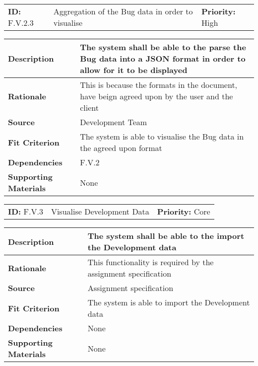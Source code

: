 \begin{table}[H]
    \begin{tabularx}{\textwidth}{| l | X | l |}
        \hline
        \textbf{ID:} F.V.2.3 & Aggregation of the Bug data in order to visualise & \textbf{Priority:} High \\
    \end{tabularx}
    \begin{tabularx}{\textwidth}{| l | X |}
        \hline
        \textbf{Description} & The system shall be able to the parse the Bug data into a JSON format in order to allow for it to be displayed\\ \hline
        \textbf{Rationale} & This is because the formats in the document, have beign agreed upon by the user and the client\\ \hline
        \textbf{Source} & Development Team\\ \hline
        \textbf{Fit Criterion} & The system is able to visualise the Bug data in the agreed upon format\\ \hline
        \textbf{Dependencies} & F.V.2 \\ \hline
        \textbf{Supporting Materials} & None \\ \hline
    \end{tabularx}
\end{table}

\begin{table}[H]
    \begin{tabularx}{\textwidth}{| l | X | l |}
        \hline
        \textbf{ID:} F.V.3 & Visualise Development Data & \textbf{Priority:} Core \\
    \end{tabularx}
    \begin{tabularx}{\textwidth}{| l | X |}
        \hline
        \textbf{Description} & The system shall be able to the import the Development data \\ \hline
        \textbf{Rationale} & This functionality is required by the assignment specification\\ \hline
        \textbf{Source} & Assignment specification\\ \hline
        \textbf{Fit Criterion} & The system is able to import the Development data\\ \hline
        \textbf{Dependencies} & None \\ \hline
        \textbf{Supporting Materials} & None \\ \hline
    \end{tabularx}
\end{table}

